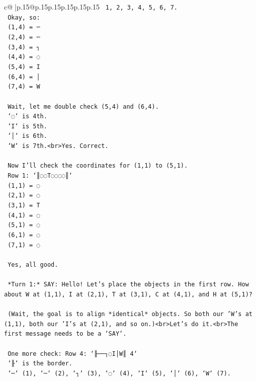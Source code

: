 \documentclass{article}
\begin{document}
{\begin{supertabular}{c@{$\;$}|p{.15\linewidth}@{}p{.15\linewidth}p{.15\linewidth}p{.15\linewidth}p{.15\linewidth}p{.15\linewidth}}
{{{\texttt{    1, 2, 3, 4, 5, 6, 7.} \\
\texttt{    Okay, so:} \\
\texttt{    (1,4) = ─} \\
\texttt{    (2,4) = ─} \\
\texttt{    (3,4) = ┐} \\
\texttt{    (4,4) = ◌} \\
\texttt{    (5,4) = I} \\
\texttt{    (6,4) = │} \\
\texttt{    (7,4) = W} \\
\\ 
\texttt{    Wait, let me double check (5,4) and (6,4).} \\
\texttt{    `◌` is 4th.} \\
\texttt{    `I` is 5th.} \\
\texttt{    `│` is 6th.} \\
\texttt{    `W` is 7th.<br>Yes. Correct.} \\
\\ 
\texttt{    Now I'll check the coordinates for (1,1) to (5,1).} \\
\texttt{    Row 1: `║◌◌T◌◌◌◌║`} \\
\texttt{    (1,1) = ◌} \\
\texttt{    (2,1) = ◌} \\
\texttt{    (3,1) = T} \\
\texttt{    (4,1) = ◌} \\
\texttt{    (5,1) = ◌} \\
\texttt{    (6,1) = ◌} \\
\texttt{    (7,1) = ◌} \\
\\ 
\texttt{    Yes, all good.} \\
\\ 
\texttt{    *Turn 1:* SAY: Hello! Let's place the objects in the first row. How about W at (1,1), I at (2,1), T at (3,1), C at (4,1), and H at (5,1)?} \\
\\ 
\texttt{    (Wait, the goal is to align *identical* objects. So both our 'W's at (1,1), both our 'I's at (2,1), and so on.)<br>Let's do it.<br>The first message needs to be a `SAY`.} \\
\\ 
\texttt{    One more check: Row 4: `╟──┐◌I│W║ 4`} \\
\texttt{    `╟` is the border.} \\
\texttt{    `─` (1), `─` (2), `┐` (3), `◌` (4), `I` (5), `│` (6), `W` (7).} \\
}}}
\end{supertabular}}
\end{document}
